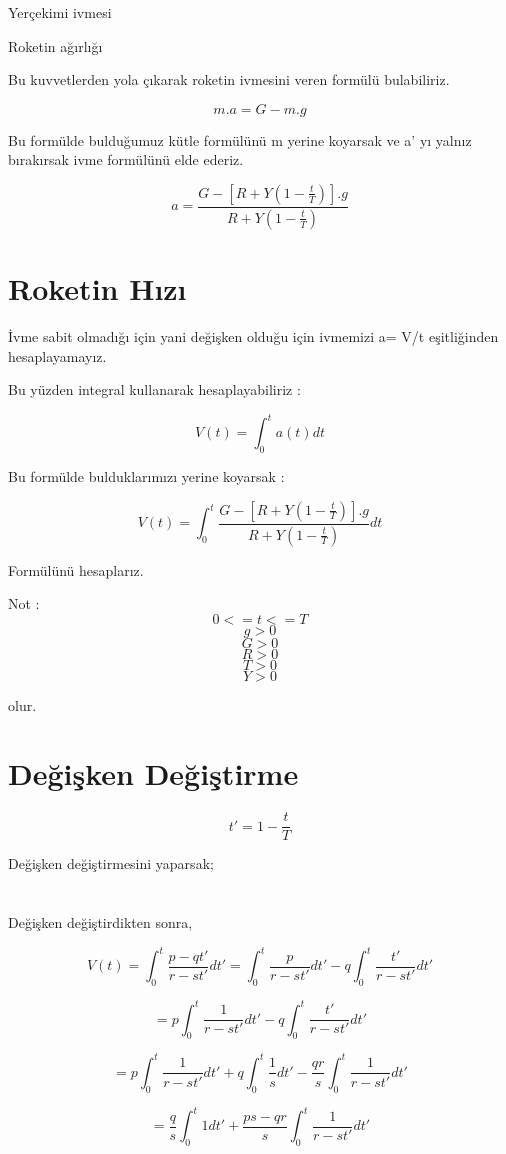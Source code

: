 \documentclass[a4paper,10pt]{article}
\begin{document}
Yerçekimi ivmesi 

Roketin ağırlığı

Bu kuvvetlerden yola çıkarak roketin ivmesini veren formülü bulabiliriz.

\[
 m.a = G - m.g
\]


Bu formülde bulduğumuz kütle formülünü m yerine koyarsak ve a' yı yalnız bırakırsak ivme formülünü elde ederiz.


\[
a = \frac {G - [ R + Y ( 1 - \frac{t}{T} ) ].g }{R + Y ( 1 - \frac{t}{T})}
\]


\section{Roketin Hızı}

İvme sabit olmadığı için yani değişken olduğu için ivmemizi        a= V/t eşitliğinden hesaplayamayız.


Bu yüzden integral kullanarak hesaplayabiliriz :

\[
 V(t) = \int_0^t a(t)dt 
\]

Bu formülde bulduklarımızı yerine koyarsak :

\[
 V(t) = \int_0^t\frac{G - [R + Y (1 - \frac{t}{T})].g}{R + Y (1 - \frac{t}{T} )}dt
\]


Formülünü hesaplarız.

Not :\[
      0 <= t <= T  
     \]
     \[
      g > 0 
     \]
     \[
      G > 0 
     \]
     \[
      R > 0 
     \]
     \[
      T > 0 
     \]
     \[
      Y > 0
     \]



   olur.

\section{Değişken Değiştirme}

 \[
  t' = 1 - \frac{t}{T}
 \]
 
    Değişken değiştirmesini yaparsak;
    
\section{}

Değişken değiştirdikten sonra,

\[
 V(t) = \int_0^t\frac{p-qt'}{r-st'} dt' = \int_0^t\frac{p}{r-st'} dt' - q \int_0^t\frac{t'}{r-st'} dt'
\]

\[ 
 = p\int_0^t\frac{1}{r-st'} dt' - q \int_0^t\frac{t'}{r-st'}dt'
\]

\[ 
 = p\int_0^t\frac{1}{r-st'} dt' +q \int_0^t\frac{1}{s} dt' -\frac{qr}{s}\int_0^t\frac{1}{r-st'} dt'
\]

\[
 = \frac{q}{s}\int_0^t{1}dt' + \frac{ps-qr}{s}\int_0^t\frac{1}{r-st'} dt'
\]
\end{document}
